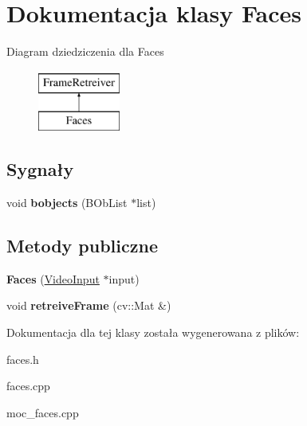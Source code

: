 \hypertarget{class_faces}{
\section{Dokumentacja klasy Faces}
\label{class_faces}
}
Diagram dziedziczenia dla Faces\begin{figure}[H]
\begin{center}
\leavevmode
\includegraphics[height=2cm]{class_faces}
\end{center}
\end{figure}
\subsection*{Sygnały}
\begin{DoxyCompactItemize}
\item 
\hypertarget{class_faces_a92e42ecfad99d9e0766b569b562b86ba}{
void {\bfseries bobjects} (BObList $\ast$list)}
\label{class_faces_a92e42ecfad99d9e0766b569b562b86ba}

\end{DoxyCompactItemize}
\subsection*{Metody publiczne}
\begin{DoxyCompactItemize}
\item 
\hypertarget{class_faces_a65ba31b6180506d6815f773365883a80}{
{\bfseries Faces} (\hyperlink{class_video_input}{VideoInput} $\ast$input)}
\label{class_faces_a65ba31b6180506d6815f773365883a80}

\item 
\hypertarget{class_faces_a7fd92e73e117b72898097551b964fd96}{
void {\bfseries retreiveFrame} (cv::Mat \&)}
\label{class_faces_a7fd92e73e117b72898097551b964fd96}

\end{DoxyCompactItemize}


Dokumentacja dla tej klasy została wygenerowana z plików:\begin{DoxyCompactItemize}
\item 
faces.h\item 
faces.cpp\item 
moc\_\-faces.cpp\end{DoxyCompactItemize}
